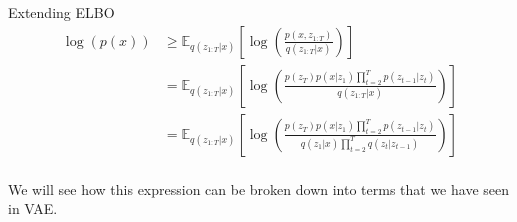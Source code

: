 \begin{frame}{Extending ELBO}
    \begin{align*}
        \log(p(x)) &\geq \mathbb{E}_{q(z_{1:T}|x)} \left[ \log \left( \frac{p(x, z_{1:T})}{q(z_{1:T}|x)} \right) \right] \\
        &= \mathbb{E}_{q(z_{1:T}|x)} \left[ \log \left( \frac{p(z_T)p(x|z_1) \prod_{t=2}^{T} p(z_{t-1}|z_t)}{q(z_{1:T}|x)} \right) \right] \\
        &= \mathbb{E}_{q(z_{1:T}|x)} \left[ \log \left( \frac{p(z_T)p(x|z_1) \prod_{t=2}^{T} p(z_{t-1}|z_t)}{q(z_1|x) \prod_{t=2}^{T} q(z_t|z_{t-1})} \right) \right] \\
    \end{align*}

    We will see how this expression can be broken down into terms that we have seen in VAE.
\end{frame}